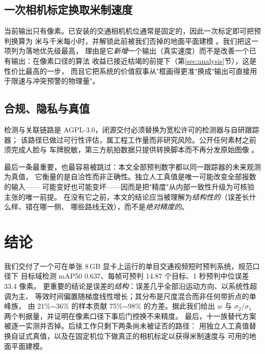 \documentclass[11pt,a4paper]{ctexart}
\begin{document}
\subsection{一次相机标定换取米制速度}

当前输出只有像素。已安装的交通相机机位通常是固定的，因此一次标定即可把预判换算为
米与千米每小时，并解锁此前被我们否掉的地面平面建模
\citep{rezaei2021trafficnet,hirano2023vipm}。我们把这一项列为落地优先级最高，
理由是它\emph{新增}一个输出（真实速度）而不是改善一个已有输出：在像素口径的算法
收益已接近枯竭的前提下（第\ref{sec:analysis}节），这是性价比最高的一步，
而且它把系统的价值叙事从"框画得更准"换成"输出可直接用于限速与冲突预警的物理量"。

\subsection{合规、隐私与真值}

检测与关联链路是 AGPL-3.0，闭源交付必须替换为宽松许可的检测器与自研跟踪器；
该路径已做过可行性评估，属工程工作量而非研究风险。公开任何素材之前须完成人脸与
车牌脱敏，第三方航拍数据只提供转换脚本而不再分发原始图像 \citep{zhu2022visdrone}。

最后一条最重要，也最容易被跳过：本文全部预判数字都以同一跟踪器的未来观测为真值，
它衡量的是自洽性而非正确性。独立人工真值是唯一可能改变全部报数的输入——
可能变好也可能变坏——因而是把"精度"从内部一致性升级为可核验主张的唯一前提。
在没有它之前，本文的结论应当被理解为\emph{结构性的}（误差长什么样、错在哪一侧、
哪些路线无效），而不是\emph{绝对精度的}。

\section{结论}
\label{sec:conclusion}

我们交付了一个可在单张 8\,GB 显卡上运行的单目交通视频短时预判系统，规范口径下
目标域检测 mAP50 0.637、每帧可预判 14.87 个目标、1 秒预判中位误差 33.4 像素。
更重要的结论是误差的\emph{结构}：误差几乎全部沿运动方向、以系统性超调为主、
等效时间偏置随梯度线性增长；其分布是尺度混合而非任何带折点的单峰族，
由 21\%$\sim$36\% 的样本贡献 75\%$\sim$98\% 的方差。据此我们给出 $w$ 与
$\sigma_2/\sigma_1$ 两个判据量，并证明在像素口径下事后门控换不来精度。
最后，十一族替代方案被逐一实测并否掉。后续工作只剩下两条尚未被证否的路径：
用独立人工真值替换自证式真值，以及在固定机位下做真正的相机标定以获得米制速度与
可用的地面平面建模。

\clearpage


\end{document}
